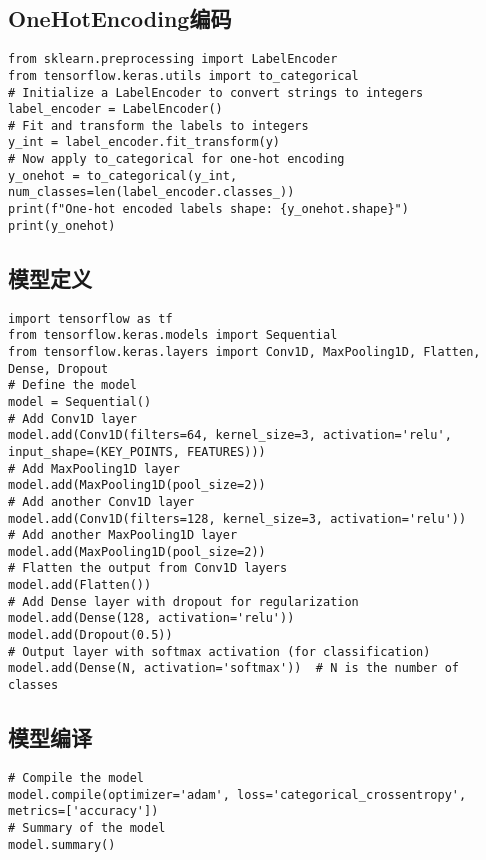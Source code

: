 \subsection{OneHotEncoding编码}

\begin{lstlisting}
from sklearn.preprocessing import LabelEncoder
from tensorflow.keras.utils import to_categorical
# Initialize a LabelEncoder to convert strings to integers
label_encoder = LabelEncoder()
# Fit and transform the labels to integers
y_int = label_encoder.fit_transform(y)
# Now apply to_categorical for one-hot encoding
y_onehot = to_categorical(y_int, num_classes=len(label_encoder.classes_))
print(f"One-hot encoded labels shape: {y_onehot.shape}")
print(y_onehot)
\end{lstlisting}

\subsection{模型定义}

\begin{lstlisting}
import tensorflow as tf
from tensorflow.keras.models import Sequential
from tensorflow.keras.layers import Conv1D, MaxPooling1D, Flatten, Dense, Dropout
# Define the model
model = Sequential()
# Add Conv1D layer
model.add(Conv1D(filters=64, kernel_size=3, activation='relu', input_shape=(KEY_POINTS, FEATURES)))
# Add MaxPooling1D layer
model.add(MaxPooling1D(pool_size=2))
# Add another Conv1D layer
model.add(Conv1D(filters=128, kernel_size=3, activation='relu'))
# Add another MaxPooling1D layer
model.add(MaxPooling1D(pool_size=2))
# Flatten the output from Conv1D layers
model.add(Flatten())
# Add Dense layer with dropout for regularization
model.add(Dense(128, activation='relu'))
model.add(Dropout(0.5))
# Output layer with softmax activation (for classification)
model.add(Dense(N, activation='softmax'))  # N is the number of classes
\end{lstlisting}

\subsection{模型编译}

\begin{lstlisting}
# Compile the model
model.compile(optimizer='adam', loss='categorical_crossentropy', metrics=['accuracy'])
# Summary of the model
model.summary()
\end{lstlisting}

